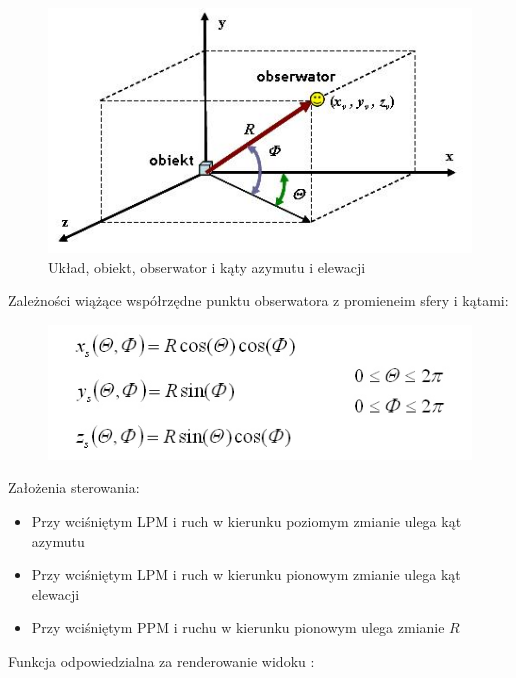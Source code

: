 \documentclass[wide,a4paper,titlepage,12pt] {article}
\begin{document}
\begin{figure}[htbp]
	\begin{center}
        	 \includegraphics[scale=1]{ukl.jpg}
     	 \caption{Układ, obiekt, obserwator i kąty azymutu i elewacji}
   	  \end{center}
\end{figure}
Zależności wiążące współrzędne punktu obserwatora z promieneim sfery i kątami:
\begin{figure}[htbp]
	\begin{center}
        	 \includegraphics[scale=0.65]{zal.jpg}

   	  \end{center}
\end{figure}
\newpage
Założenia sterowania:
\begin{itemize}
	\item Przy wciśniętym LPM i ruch w kierunku poziomym zmianie ulega kąt azymutu
	\item Przy wciśniętym LPM i ruch w kierunku pionowym zmianie ulega kąt elewacji
	\item Przy wciśniętym PPM i ruchu w kierunku pionowym ulega zmianie $R$
\end{itemize}
Funkcja odpowiedzialna za renderowanie widoku : 
\end{document}
